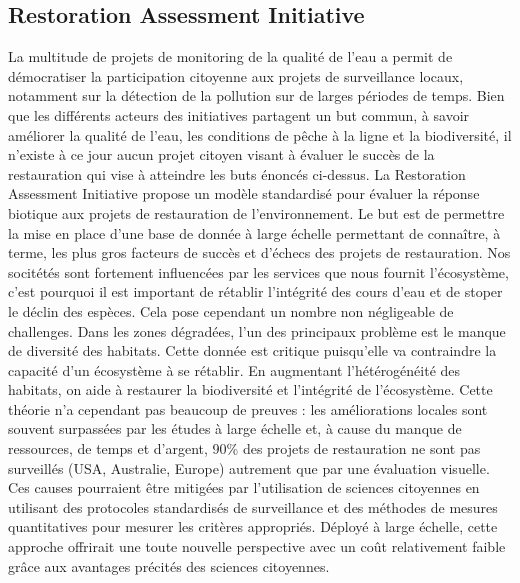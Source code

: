 \documentclass[10pt, article]{llncs}
\begin{document}
	\subsection{Restoration Assessment Initiative}
		La multitude de projets de monitoring de la qualité de l'eau a permit de démocratiser la participation citoyenne aux projets de surveillance locaux, notamment sur la détection de la pollution sur de larges périodes de temps. Bien que les différents acteurs des initiatives partagent un but commun, à savoir améliorer la qualité de l'eau, les conditions de pêche à la ligne et la biodiversité, il n'existe à ce jour aucun projet citoyen visant à évaluer le succès de la restauration qui vise à atteindre les buts énoncés ci-dessus. La Restoration Assessment Initiative propose un modèle standardisé pour évaluer la réponse biotique aux projets de restauration de l'environnement. Le but est de permettre la mise en place d'une base de donnée à large échelle permettant de connaître, à terme, les plus gros facteurs de succès et d'échecs des projets de restauration. Nos socitétés sont fortement influencées par les services que nous fournit l'écosystème, c'est pourquoi il est important de rétablir l'intégrité des cours d'eau et de stoper le déclin des espèces. Cela pose cependant un nombre non négligeable de challenges.
		Dans les zones dégradées, l'un des principaux problème est le manque de diversité des habitats. Cette donnée est critique puisqu'elle va contraindre la capacité d'un écosystème à se rétablir. En augmentant l'hétérogénéité des habitats, on aide à restaurer la biodiversité et l'intégrité de l'écosystème. Cette théorie n'a cependant pas beaucoup de preuves : les améliorations locales sont souvent surpassées par les études à large échelle et, à cause du manque de ressources, de temps et d'argent, 90\% des projets de restauration ne sont pas surveillés (USA, Australie, Europe) autrement que par une évaluation visuelle. Ces causes pourraient être mitigées par l'utilisation de sciences citoyennes en utilisant des protocoles standardisés de surveillance et des méthodes de mesures quantitatives pour mesurer les critères appropriés. Déployé à large échelle, cette approche offrirait une toute nouvelle perspective avec un coût relativement faible grâce aux avantages précités des sciences citoyennes.\\
\end{document}
